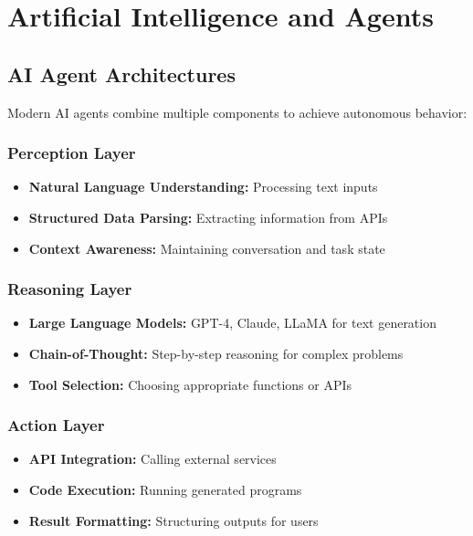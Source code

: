 \section{Artificial Intelligence and Agents}

\subsection{AI Agent Architectures}

Modern AI agents combine multiple components to achieve autonomous behavior:

\subsubsection{Perception Layer}
\begin{itemize}
    \item \textbf{Natural Language Understanding:} Processing text inputs
    \item \textbf{Structured Data Parsing:} Extracting information from APIs
    \item \textbf{Context Awareness:} Maintaining conversation and task state
\end{itemize}

\subsubsection{Reasoning Layer}
\begin{itemize}
    \item \textbf{Large Language Models:} GPT-4, Claude, LLaMA for text generation
    \item \textbf{Chain-of-Thought:} Step-by-step reasoning for complex problems
    \item \textbf{Tool Selection:} Choosing appropriate functions or APIs
\end{itemize}

\subsubsection{Action Layer}
\begin{itemize}
    \item \textbf{API Integration:} Calling external services
    \item \textbf{Code Execution:} Running generated programs
    \item \textbf{Result Formatting:} Structuring outputs for users
\end{itemize}

